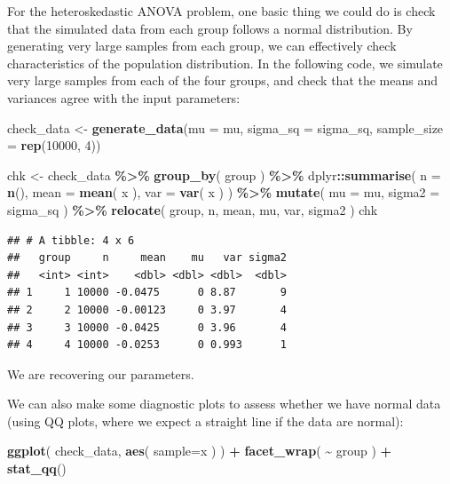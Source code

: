 \documentclass[
]{book}
\newenvironment{Shaded}{\begin{snugshade}}{\end{snugshade}}
\newcommand{\AttributeTok}[1]{\textcolor[rgb]{0.13,0.29,0.53}{#1}}
\newcommand{\DecValTok}[1]{\textcolor[rgb]{0.00,0.00,0.81}{#1}}
\newcommand{\FunctionTok}[1]{\textcolor[rgb]{0.13,0.29,0.53}{\textbf{#1}}}
\newcommand{\NormalTok}[1]{#1}
\newcommand{\OtherTok}[1]{\textcolor[rgb]{0.56,0.35,0.01}{#1}}
\newcommand{\SpecialCharTok}[1]{\textcolor[rgb]{0.81,0.36,0.00}{\textbf{#1}}}
\begin{document}
For the heteroskedastic ANOVA problem, one basic thing we could do is check that the simulated data from each group follows a normal distribution. By generating very large samples from each group, we can effectively check characteristics of the population distribution.
In the following code, we simulate very large samples from each of the four groups, and check that the means and variances agree with the input parameters:

\begin{Shaded}
\begin{Highlighting}[]
\NormalTok{check\_data }\OtherTok{\textless{}{-}} \FunctionTok{generate\_data}\NormalTok{(}\AttributeTok{mu =}\NormalTok{ mu, }\AttributeTok{sigma\_sq =}\NormalTok{ sigma\_sq,}
                            \AttributeTok{sample\_size =} \FunctionTok{rep}\NormalTok{(}\DecValTok{10000}\NormalTok{, }\DecValTok{4}\NormalTok{))}

\NormalTok{chk }\OtherTok{\textless{}{-}}\NormalTok{ check\_data }\SpecialCharTok{\%\textgreater{}\%} \FunctionTok{group\_by}\NormalTok{( group ) }\SpecialCharTok{\%\textgreater{}\%}
\NormalTok{  dplyr}\SpecialCharTok{::}\FunctionTok{summarise}\NormalTok{( }\AttributeTok{n =} \FunctionTok{n}\NormalTok{(),}
             \AttributeTok{mean =} \FunctionTok{mean}\NormalTok{( x ),}
             \AttributeTok{var =} \FunctionTok{var}\NormalTok{( x ) ) }\SpecialCharTok{\%\textgreater{}\%}
  \FunctionTok{mutate}\NormalTok{( }\AttributeTok{mu =}\NormalTok{ mu,}
          \AttributeTok{sigma2 =}\NormalTok{ sigma\_sq ) }\SpecialCharTok{\%\textgreater{}\%}
  \FunctionTok{relocate}\NormalTok{( group, n, mean, mu, var, sigma2 )}
\NormalTok{chk}
\end{Highlighting}
\end{Shaded}

\begin{verbatim}
## # A tibble: 4 x 6
##   group     n     mean    mu   var sigma2
##   <int> <int>    <dbl> <dbl> <dbl>  <dbl>
## 1     1 10000 -0.0475      0 8.87       9
## 2     2 10000 -0.00123     0 3.97       4
## 3     3 10000 -0.0425      0 3.96       4
## 4     4 10000 -0.0253      0 0.993      1
\end{verbatim}

We are recovering our parameters.

We can also make some diagnostic plots to assess whether we have normal data (using QQ plots, where we expect a straight line if the data are normal):

\begin{Shaded}
\begin{Highlighting}[]
\FunctionTok{ggplot}\NormalTok{( check\_data, }\FunctionTok{aes}\NormalTok{( }\AttributeTok{sample=}\NormalTok{x ) ) }\SpecialCharTok{+}
  \FunctionTok{facet\_wrap}\NormalTok{( }\SpecialCharTok{\textasciitilde{}}\NormalTok{ group ) }\SpecialCharTok{+}
  \FunctionTok{stat\_qq}\NormalTok{()}
\end{Highlighting}
\end{Shaded}
\end{document}
